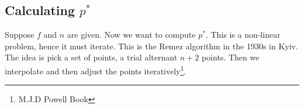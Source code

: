 \subsection{Calculating $p^*$}
Suppose $f$ and $n $ are given. Now we want to compute $p^*$. This is a non-linear problem, hence it must iterate. This is the Remez algorithm in the 1930s in Kyiv. The idea is pick a set of points, a trial alternant $n+2$ points. Then we interpolate and then adjust the points iteratively\footnote{M.J.D Powell Book}. 

